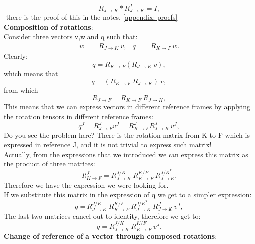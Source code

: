 \begin{enumerate}
\begin{equation}
            R_{J\to K} * R^T_{J\to K} = I, 
        \end{equation}        
    -there is the proof of this in the notes, \autoref{appendix: proofs}-\\
    \textbf{Composition of rotations}:\\
    Consider three vectors v,w and q such that:
    \begin{align}
        w &= R_{J\to K }~v, & q&= R_{K\to F}~w.
    \end{align}
    Clearly:
    \begin{equation}
        q = R_{K\to F} (R_{J\to K }~v),
    \end{equation}
    which means that 
    \begin{equation}
        q =( R_{K\to F} ~R_{J\to K })~v,
    \end{equation}
    from which
    \begin{equation}
        R_{J\to F} = R_{K\to F} ~R_{J\to K },
    \end{equation}
    This means that we can express vectors in different reference frames by applying the rotation tensors in different reference frames:
    \begin{equation}
        q^J = R_{J\to F}^J v^J = R_{K\to F}^J R_{J\to K}^J ~v^J,
    \end{equation}
    Do you see the problem here? There is the rotation matrix from K to F which is expressed in reference J, and it is not trivial to express such matrix!\\
    Actually, from the expressions that we introduced we can express this matrix as the product of three matrices:
    \begin{equation}
        R_{K\to F}^J = R_{J\to K}^{J/K} ~R_{K\to F}^{K/F} ~R_{J\to K}^{{J/K}^T}.
    \end{equation}
    Therefore we have the expression we were looking for.
    \\
    If we substitute this matrix in the expression of q we get to a simpler expression:
    \begin{equation}
        q = R_{J\to K}^{J/K} ~R_{K\to F}^{K/F} ~R_{J\to K}^{{J/K}^T} ~R_{J\to K}^J ~v^J,
    \end{equation}
    The last two matrices cancel out to identity, therefore we get to:
    \begin{equation}
        q = R_{J\to K}^{J/K} ~R_{K\to F}^{K/F}  ~v^J.
    \end{equation}
    \textbf{Change of reference of a vector through composed rotations}:\\

\end{enumerate}
